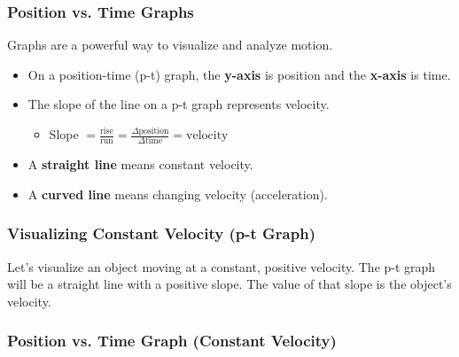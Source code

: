 \documentclass{beamer}
\begin{document}
\begin{frame}
\frametitle{Position vs. Time Graphs}
Graphs are a powerful way to visualize and analyze motion.
\begin{itemize}
    \item On a position-time (p-t) graph, the \textbf{y-axis} is position and the \textbf{x-axis} is time.
    \item The \alert{slope} of the line on a p-t graph represents \alert{velocity}.
    \begin{itemize}
        \item Slope $= \frac{\text{rise}}{\text{run}} = \frac{\Delta \text{position}}{\Delta \text{time}} = \text{velocity}$
    \end{itemize}
    \item A \textbf{straight line} means constant velocity.
    \item A \textbf{curved line} means changing velocity (acceleration).
\end{itemize}
\end{frame}

\begin{frame}
\frametitle{Visualizing Constant Velocity (p-t Graph)}
Let's visualize an object moving at a constant, positive velocity. The p-t graph will be a straight line with a positive slope. The value of that slope is the object's velocity.
\end{frame}

\begin{frame}
\frametitle{Position vs. Time Graph (Constant Velocity)}
\begin{figure}
\end{figure}
\end{frame}
\end{document}
